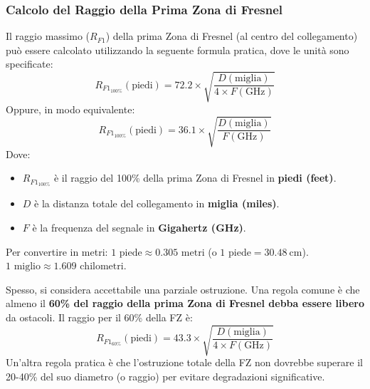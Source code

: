 \subsubsection{Calcolo del Raggio della Prima Zona di Fresnel}
Il raggio massimo ($R_{F1}$) della prima Zona di Fresnel (al centro del collegamento) può essere calcolato utilizzando la seguente formula pratica, dove le unità sono specificate:
\[ R_{F1_{\text{100\%}}} (\text{piedi}) = 72.2 \times \sqrt{\frac{D (\text{miglia})}{4 \times F (\text{GHz})}} \]
Oppure, in modo equivalente:
\[ R_{F1_{\text{100\%}}} (\text{piedi}) = 36.1 \times \sqrt{\frac{D (\text{miglia})}{F (\text{GHz})}} \]
Dove:
\begin{itemize}
    \item $R_{F1_{\text{100\%}}}$ è il raggio del 100\% della prima Zona di Fresnel in \textbf{piedi (feet)}.
    \item $D$ è la distanza totale del collegamento in \textbf{miglia (miles)}.
    \item $F$ è la frequenza del segnale in \textbf{Gigahertz (GHz)}.
\end{itemize}
Per convertire in metri: $1 \text{ piede} \approx 0.305 \text{ metri}$ (o $1 \text{ piede} = \SI{30.48}{\centi\meter}$).
$1 \text{ miglio} \approx 1.609 \text{ chilometri}$.

Spesso, si considera accettabile una parziale ostruzione. Una regola comune è che almeno il \textbf{60\% del raggio della prima Zona di Fresnel debba essere libero} da ostacoli. Il raggio per il 60\% della FZ è:
\[ R_{F1_{\text{60\%}}} (\text{piedi}) = 43.3 \times \sqrt{\frac{D (\text{miglia})}{4 \times F (\text{GHz})}} \]
Un'altra regola pratica è che l'ostruzione totale della FZ non dovrebbe superare il 20-40\% del suo diametro (o raggio) per evitare degradazioni significative.

